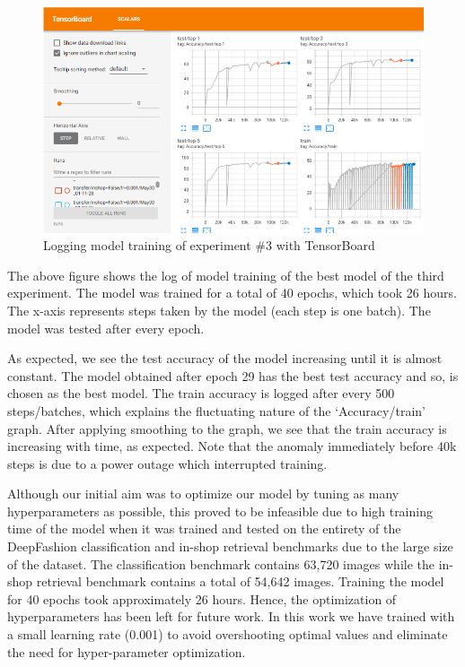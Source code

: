 \begin{figure}[H]
\includegraphics[width=15cm]{images/tensorboard.PNG} 
\centering
\caption{Logging model training of experiment \#3 with TensorBoard}
\label{architecture}
\end{figure}

The above figure shows the log of model training of the best model of the third experiment. The model was trained for a total of 40 epochs, which took 26 hours. The x-axis represents steps taken by the model (each step is one batch). The model was tested after every epoch. 

As expected, we see the test accuracy of the model increasing until it is almost constant. The model obtained after epoch 29 has the best test accuracy and so, is chosen as the best model. The train accuracy is logged after every 500 steps/batches, which explains the fluctuating nature of the ‘Accuracy/train’ graph. After applying smoothing to the graph, we see that the train accuracy is increasing with time, as expected. Note that the anomaly immediately before 40k steps is due to a power outage which interrupted training. 

Although our initial aim was to optimize our model by tuning as many hyperparameters as possible, this proved to be infeasible due to high training time of the model when it was trained and tested on the entirety of the DeepFashion classification and in-shop retrieval benchmarks due to the large size of the dataset. The classification benchmark contains 63,720 images while the in-shop retrieval benchmark contains a total of 54,642 images. Training the model for 40 epochs took approximately 26 hours. Hence, the optimization of hyperparameters has been left for future work. In this work we have trained with a small learning rate (0.001) to avoid overshooting optimal values and eliminate the need for hyper-parameter optimization. 

